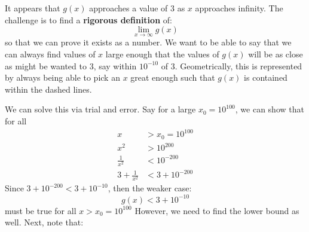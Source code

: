 \begin{itemize}
\begin{center}
    \end{center}
    It appears that $g(x)$ approaches a value of $3$ as $x$ approaches infinity. The challenge is to find a \textbf{rigorous definition} of:
    \begin{equation}
        \lim_{x\to\infty}g(x)
        \label{eq:}
    \end{equation}
    so that we can prove it exists as a number. We want to be able to say that we can always find values of $x$ large enough that the values of $g(x)$ will be as close as might be wanted to $3$, say within $10^{-10}$ of $3$. Geometrically, this is represented by always being able to pick an $x$ great enough such that $g(x)$ is contained within the dashed lines. 
    \begin{center}
    \end{center}
    We can solve this via trial and error. Say for a large $x_0=10^{100}$, we can show that for all
    \begin{align}
        x &> x_0=10^{100} \\
        x^2 &> 10^{200} \\ 
        \frac{1}{x^2} &< 10^{-200} \\ 
        3+\frac{1}{x^2} &< 3+10^{-200}
    \end{align}
    Since $3+10^{-200}<3+10^{-10}$, then the weaker case:
    \begin{equation}
        g(x) < 3+10^{-10}
        \label{eq:}
    \end{equation}
    must be true for all $x>x_0=10^{100}$ However, we need to find the lower bound as well. Next, note that:
    \begin{equation}

\end{equation}
\end{itemize}
